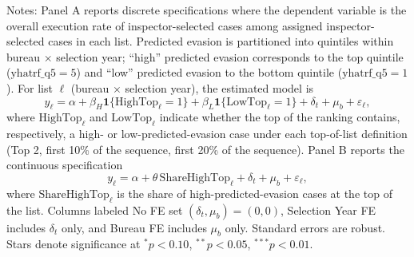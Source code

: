 \begin{table}[H]\centering
\begin{threeparttable}
\caption{Execution of inspector-assigned audits and high predicted evasion cases at the top of the list [Full audits]}
\label{tab:exec_rate_full_panels_inspector}

\footnotesize


\begin{tablenotes}[flushleft]
\footnotesize
\item Notes: Panel A reports discrete specifications where the dependent variable is the overall execution rate of inspector-selected cases among assigned inspector-selected cases in each list. Predicted evasion is partitioned into quintiles within bureau $\times$ selection year; ``high'' predicted evasion corresponds to the top quintile ($\text{yhatrf\_q5}=5$) and ``low'' predicted evasion to the bottom quintile ($\text{yhatrf\_q5}=1$). For list $\ell$ (bureau $\times$ selection year), the estimated model is
\[
y_{\ell}=\alpha+\beta_H\mathbf{1}\{\text{HighTop}_{\ell}=1\}+\beta_L\mathbf{1}\{\text{LowTop}_{\ell}=1\}+\delta_t+\mu_b+\varepsilon_{\ell},
\]
where $\text{HighTop}_{\ell}$ and $\text{LowTop}_{\ell}$ indicate whether the top of the ranking contains, respectively, a high- or low-predicted-evasion case under each top-of-list definition (Top 2, first 10\% of the sequence, first 20\% of the sequence). Panel B reports the continuous specification
\[
y_{\ell}=\alpha+\theta\,\text{ShareHighTop}_{\ell}+\delta_t+\mu_b+\varepsilon_{\ell},
\]
where $\text{ShareHighTop}_{\ell}$ is the share of high-predicted-evasion cases at the top of the list. Columns labeled No FE set $(\delta_t,\mu_b)=(0,0)$, Selection Year FE includes $\delta_t$ only, and Bureau FE includes $\mu_b$ only. Standard errors are robust. Stars denote significance at $^{*}p<0.10$, $^{**}p<0.05$, $^{***}p<0.01$.
\end{tablenotes}
\end{threeparttable}
\end{table}
